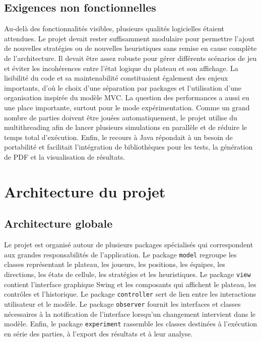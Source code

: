 \documentclass[11pt,a4paper]{article}
\begin{document}
\subsection{Exigences non fonctionnelles}

Au-delà des fonctionnalités visibles, plusieurs qualités logicielles étaient attendues. Le projet devait rester suffisamment modulaire pour permettre l'ajout de nouvelles stratégies ou de nouvelles heuristiques sans remise en cause complète de l'architecture. Il devait être assez robuste pour gérer différents scénarios de jeu et éviter les incohérences entre l'état logique du plateau et son affichage. La lisibilité du code et sa maintenabilité constituaient également des enjeux importants, d'où le choix d'une séparation par packages et l'utilisation d'une organisation inspirée du modèle MVC. La question des performances a aussi eu une place importante, surtout pour le mode expérimentation. Comme un grand nombre de parties doivent être jouées automatiquement, le projet utilise du multithreading afin de lancer plusieurs simulations en parallèle et de réduire le temps total d'exécution. Enfin, le recours à Java répondait à un besoin de portabilité et facilitait l'intégration de bibliothèques pour les tests, la génération de PDF et la visualisation de résultats.

\section{Architecture du projet}
\subsection{Architecture globale}

Le projet est organisé autour de plusieurs packages spécialisés qui correspondent aux grandes responsabilités de l'application. Le package \texttt{model} regroupe les classes représentant le plateau, les joueurs, les positions, les équipes, les directions, les états de cellule, les stratégies et les heuristiques. Le package \texttt{view} contient l'interface graphique Swing et les composants qui affichent le plateau, les contrôles et l'historique. Le package \texttt{controller} sert de lien entre les interactions utilisateur et le modèle. Le package \texttt{observer} fournit les interfaces et classes nécessaires à la notification de l'interface lorsqu'un changement intervient dans le modèle. Enfin, le package \texttt{experiment} rassemble les classes destinées à l'exécution en série des parties, à l'export des résultats et à leur analyse.
\end{document}
